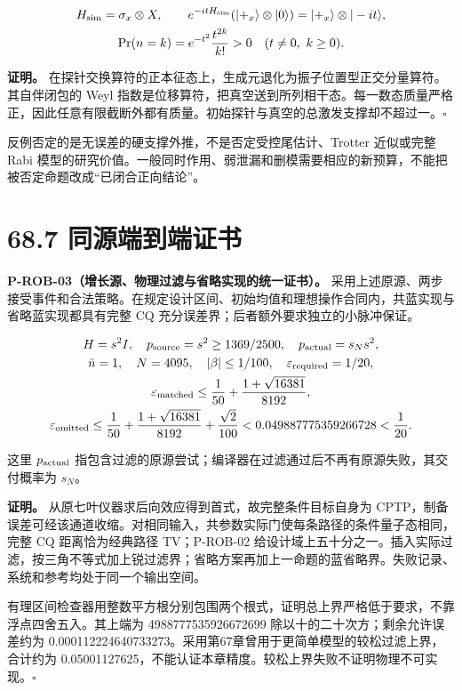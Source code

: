 \documentclass[
  11pt,
  oneside]{book}
\begin{document}
\[
\begin{gathered}
H_{\rm sim}=\sigma_x\otimes X,\qquad
e^{-itH_{\rm sim}}(|+_x\rangle\otimes|0\rangle)
=|+_x\rangle\otimes|-it\rangle,\\
\Pr(n=k)=e^{-t^2}\frac{t^{2k}}{k!}>0\quad(t\ne0,\ k\ge0).
\end{gathered}
\]

\textbf{证明。}
在探针交换算符的正本征态上，生成元退化为振子位置型正交分量算符。其自伴闭包的
Weyl
指数是位移算符，把真空送到所列相干态。每一数态质量严格正，因此任意有限截断外都有质量。初始探针与真空的总激发支撑却不超过一。\(\square\)

反例否定的是无误差的硬支撑外推，不是否定受控尾估计、Trotter 近似或完整
Rabi
模型的研究价值。一般同时作用、弱泄漏和删模需要相应的新预算，不能把被否定命题改成``已闭合正向结论''。

\section{68.7 同源端到端证书}

\protect\hypertarget{p-rob-03}{}{}

\textbf{P-ROB-03（增长源、物理过滤与省略实现的统一证书）。}
采用上述原源、两步接受事件和合法策略。在规定设计区间、初始均值和理想操作合同内，共蓝实现与省略蓝实现都具有完整
CQ 充分误差界；后者额外要求独立的小脉冲保证。

\[
\begin{gathered}
H=s^2I,\quad p_{\rm source}=s^2\ge1369/2500,\quad
p_{\rm actual}=s_Ns^2,\\
\bar n=1,\quad N=4095,\quad |\beta|\le1/100,\quad
\varepsilon_{\rm required}=1/20,\\
\varepsilon_{\rm matched}\le\frac1{50}+\frac{1+\sqrt{16381}}{8192},\\
\varepsilon_{\rm omitted}\le\frac1{50}+\frac{1+\sqrt{16381}}{8192}
+\frac{\sqrt2}{100}
<0.049887775359266728<\frac1{20}.
\end{gathered}
\]

这里 \(p_{\rm actual}\)
指包含过滤的原源尝试；编译器在过滤通过后不再有原源失败，其交付概率为
\(s_N\)。

\textbf{证明。} 从原七叶仪器求后向效应得到首式，故完整条件目标自身为
CPTP，制备误差可经该通道收缩。对相同输入，共参数实际门使每条路径的条件量子态相同，完整
CQ 距离恰为经典路径 TV；P-ROB-02
给设计域上五十分之一。插入实际过滤，按三角不等式加上锐过滤界；省略方案再加上一命题的蓝省略界。失败记录、系统和参考均处于同一个输出空间。

有理区间检查器用整数平方根分别包围两个根式，证明总上界严格低于要求，不靠浮点四舍五入。其上端为
4988777535926672699 除以十的二十次方；剩余允许误差约为
0.000112224640733273。采用第67章曾用于更简单模型的较松过滤上界，合计约为
0.05001127625，不能认证本章精度。较松上界失败不证明物理不可实现。\(\square\)
\end{document}

